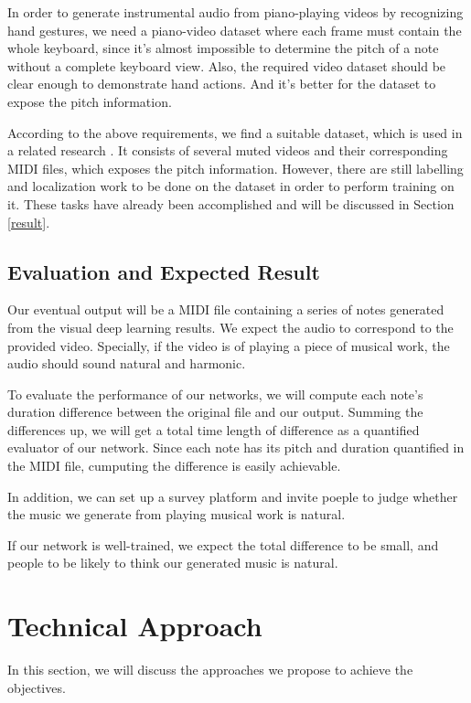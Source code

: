 \documentclass[10pt,twocolumn,letterpaper]{article}
\begin{document}
In order to generate instrumental audio from piano-playing videos by recognizing hand gestures, we need a piano-video dataset where each frame must contain the whole keyboard, since it's almost impossible to determine the pitch of a note without a complete keyboard view.
Also, the required video dataset should be clear enough to demonstrate hand actions. And it's better for the dataset to expose the pitch information.

According to the above requirements, we find a suitable dataset, which is used in a related research \cite{Akbari}. It consists of several muted videos and their corresponding MIDI files, which exposes the pitch information.
However, there are still labelling and localization work to be done on the dataset in order to perform training on it. These tasks have already been accomplished and will be discussed in Section \ref{result}.

\subsection{Evaluation and Expected Result}

Our eventual output will be a MIDI file containing a series of notes generated from the visual deep learning results. We expect the audio to correspond to the provided video. Specially, if the video is of playing a piece of musical work, the audio should sound natural and harmonic.

To evaluate the performance of our networks, we will compute each note's duration difference between the original file and our output. Summing the differences up, we will get a total time length of difference as a quantified evaluator of our network. Since each note has its pitch and duration quantified in the MIDI file, cumputing the difference is easily achievable.

In addition, we can set up a survey platform and invite poeple to judge whether the music we generate from playing musical work is natural.

If our network is well-trained, we expect the total difference to be small, and people to be likely to think our generated music is natural.

\section{Technical Approach}

In this section, we will discuss the approaches we propose to achieve the objectives.
\end{document}
